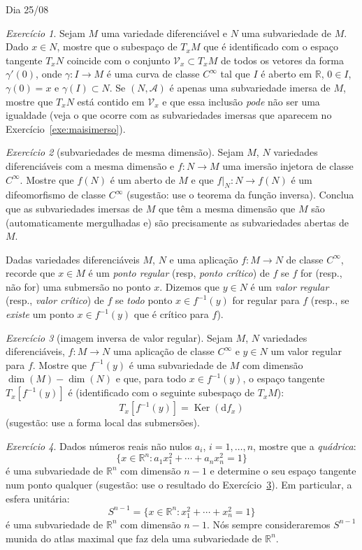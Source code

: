 \documentclass[oneside,11pt]{amsart}
\newcommand{\R}{\mathds R}
\newcommand{\dd}{\mathrm d}
\DeclareMathOperator{\Dim}{dim}
\DeclareMathOperator{\Ker}{Ker}
\theoremstyle{remark}\newtheorem{exercise}{Exercício}[section]
\theoremstyle{plain}\newtheorem{teo}{Teorema}[section]
\theoremstyle{plain}\newtheorem{lem}[teo]{Lema}
\theoremstyle{plain}\newtheorem{prop}[teo]{Proposição}
\theoremstyle{definition}\newtheorem{defin}[teo]{Definição}
\theoremstyle{remark}\newtheorem{rem}[teo]{Observação}
\theoremstyle{definition}\newtheorem{example}[teo]{Exemplo}
\numberwithin{equation}{section}
\begin{document}
\begin{section}{Dia 25/08}
\begin{exercise}
Sejam $M$ uma variedade diferenciável e $N$ uma subvariedade de $M$. Dado $x\in N$, mostre que o subespaço
de $T_xM$ que é identificado com o espaço tangente
$T_xN$ coincide com o conjunto $\mathcal V_x\subset T_xM$
de todos os vetores da forma $\gamma'(0)$, onde $\gamma:I\to M$ é uma curva
de classe $C^\infty$ tal que $I$ é aberto em $\R$, $0\in I$, $\gamma(0)=x$ e $\gamma(I)\subset N$.
Se $(N,\mathcal A)$ é apenas uma subvariedade imersa de $M$, mostre que $T_xN$ está contido em $\mathcal V_x$
e que essa inclusão {\em pode\/} não ser uma igualdade (veja o que ocorre com as subvariedades imersas que aparecem
no Exercício~\ref{exe:maisimerso}).
\end{exercise}

\begin{exercise}[subvariedades de mesma dimensão]
Sejam $M$, $N$ variedades diferenciáveis com a mesma dimensão e $f:N\to M$ uma imersão injetora de classe $C^\infty$. Mostre que $f(N)$ é um aberto de $M$ e que
$f\vert_N:N\to f(N)$ é um difeomorfismo de classe $C^\infty$ (sugestão: use o teorema da função inversa). Conclua que as subvariedades imersas de $M$
que têm a mesma dimensão que $M$ são (automaticamente mergulhadas e) são precisamente as subvariedades abertas de $M$.
\end{exercise}

Dadas variedades diferenciáveis $M$, $N$ e uma aplicação $f:M\to N$ de classe $C^\infty$, recorde que $x\in M$
é um {\em ponto regular\/} (resp, {\em ponto crítico}) de $f$ se $f$ for (resp., não for) uma submersão no ponto
$x$. Dizemos que $y\in N$ é um {\em valor regular\/} (resp., {\em valor crítico}) de $f$ se {\em todo\/} ponto $x\in f^{-1}(y)$
for regular para $f$ (resp., se {\em existe\/} um ponto $x\in f^{-1}(y)$ que é crítico para $f$).
\begin{exercise}[imagem inversa de valor regular]\label{exe:valorregular}
Sejam $M$, $N$ variedades diferenciáveis, $f:M\to N$ uma aplicação de classe $C^\infty$ e $y\in N$ um valor regular
para $f$. Mostre que $f^{-1}(y)$ é uma subvariedade de $M$ com dimensão $\Dim(M)-\Dim(N)$ e que, para todo $x\in f^{-1}(y)$,
o espaço tangente $T_x[f^{-1}(y)]$ é (identificado com o seguinte subespaço de $T_xM$):
\[T_x[f^{-1}(y)]=\Ker(\dd f_x)\]
(sugestão: use a forma local das submersões).
\end{exercise}

\begin{exercise}
Dados números reais não nulos $a_i$, $i=1,\ldots,n$, mostre que a {\em quádrica}:
\[\big\{x\in\R^n:a_1x_1^2+\cdots+a_nx_n^2=1\big\}\]
é uma subvariedade de $\R^n$ com dimensão $n-1$ e determine o seu espaço tangente num ponto qualquer
(sugestão: use o resultado do Exercício~\ref{exe:valorregular}). Em particular,
a esfera unitária:
\[S^{n-1}=\big\{x\in\R^n:x_1^2+\cdots+x_n^2=1\big\}\]
é uma subvariedade de $\R^n$ com dimensão $n-1$. Nós sempre consideraremos $S^{n-1}$ munida do atlas maximal que faz dela uma subvariedade
de $\R^n$.
\end{exercise}


\end{section}
\end{document}
